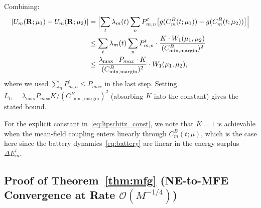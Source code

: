 \documentclass[journal]{IEEEtran}
\newcommand{\CB}{C^{B}}
\newcommand{\Pmax}{P_{max}}
\newcommand{\bfR}{\mathbf{R}}
\begin{document}
\begin{IEEEproof}
Combining:
\begin{align}
    |U_m(\bfR;\mu_1) - U_m(\bfR;\mu_2)|
    &= \Bigl|\sum_t \lambda_m(t)
    \sum_n P_{m,n}^t
    \bigl[g(\CB_m(t;\mu_1))
    - g(\CB_m(t;\mu_2))\bigr]\Bigr|
    \notag\\
    &\leq \sum_t \lambda_m(t)
    \sum_n P_{m,n}^t
    \cdot \frac{K \cdot W_1(\mu_1,\mu_2)}%
    {(C^B_{\min,\mathrm{margin}})^2}
    \notag\\
    &\leq \frac{\lambda_{\max} \cdot \Pmax \cdot K}%
    {(C^B_{\min,\mathrm{margin}})^2}
    \cdot W_1(\mu_1, \mu_2),
\end{align}
where we used $\sum_n P_{m,n}^t \leq \Pmax$ in the last step. Setting $L_U = \lambda_{\max}\Pmax K / (C^B_{\min,\mathrm{margin}})^2$ (absorbing $K$ into the constant) gives the stated bound.

For the explicit constant in~\eqref{eq:lipschitz_const}, we note that $K = 1$ is achievable when the mean-field coupling enters linearly through $\CB_m(t;\mu)$, which is the case here since the battery dynamics~\eqref{eq:battery} are linear in the energy surplus $\Delta E_m^t$.

\end{IEEEproof}

\subsection{Proof of Theorem~\ref{thm:mfg}
(NE-to-MFE Convergence at Rate $\mathcal{O}(M^{-1/4})$)}
\end{document}
